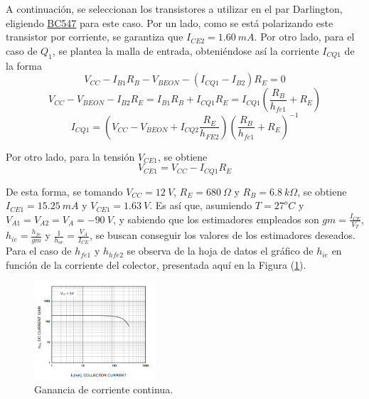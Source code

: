 A continuación, se seleccionan los transistores a utilizar en el par Darlington, eligiendo \href{https://www.sparkfun.com/datasheets/Components/BC546.pdf}{BC547} para este caso. Por un lado, como se está polarizando este transistor por corriente, se garantiza que $I_{CE2} = 1.60 \ mA$. Por otro lado, para el caso de $Q_1$, se plantea la malla de entrada, obteniéndose así la corriente $I_{CQ1}$ de la forma
\begin{equation*}
	V_{CC} - I_{B1} R_B - V_{BEON} - \left( I_{CQ1} - I_{B2} \right) R_E = 0
\end{equation*}
\begin{equation*}
	V_{CC} - V_{BEON} - I_{B2} R_E = I_{B1} R_B + I_{CQ1} R_E = I_{CQ1} \left( \frac{R_B}{h_{fe1}} + R_E \right)
\end{equation*}
\begin{equation}
	I_{CQ1} = \left( V_{CC} - V_{BEON} + I_{CQ2} \frac{R_E}{h_{FE2}} \right) \left( \frac{R_B}{h_{fe1}} + R_E \right)^{-1}
\end{equation}

Por otro lado, para la tensión $V_{CE1}$, se obtiene
\begin{equation}
	V_{CE1} = V_{CC} - I_{CQ1} R_E
\end{equation}

De esta forma, se tomando $V_{CC} = 12 \ V$, $R_E = 680 \ \Omega$ y $R_B = 6.8 \ k\Omega$, se obtiene $I_{CE1} = 15.25 \ mA$ y $V_{CE1} = 1.63 \ V$. Es así que, asumiendo $T = 27^o C$ y $V_{A1} = V_{A2} = V_A = -90 \ V$, y sabiendo que los estimadores empleados son $gm = \frac{I_{CE}}{V_T}$, $h_{ie} = \frac{h_{fe}}{gm}$ y $\frac{1}{h_{oe}} = \frac{V_A}{I_{CE}}$, se buscan conseguir los valores de los estimadores deseados. Para el caso de $h_{fe1}$ y $h_{hfe2}$ se observa de la hoja de datos el gráfico de $h_{ie}$ en función de la corriente del colector, presentada aquí en la Figura (\ref{fig:hfe-i}).
\begin{figure}[H]
\centering
	\includegraphics[width=0.4\textwidth, page=3]{Imagenes/Dc-Current-Gain.png}
	\caption{Ganancia de corriente continua.}
\label{fig:hfe-i}
\end{figure}

